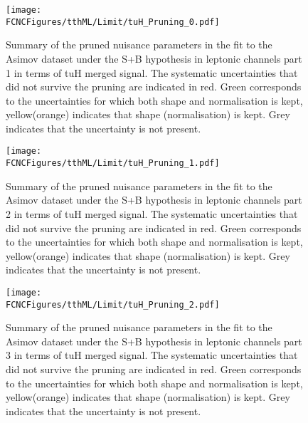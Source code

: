 \begin{figure}[htb]
\centering
\texttt{[image: \\FCNCFigures/tthML/Limit/tuH\_Pruning\_0.pdf]}
\caption{ Summary of the pruned nuisance parameters in the fit to the  Asimov dataset under the S+B hypothesis in leptonic channels part 1 in terms of tuH merged signal. The systematic uncertainties that did not survive the pruning are indicated in red. Green corresponds to the uncertainties for which both shape and normalisation is kept, yellow(orange) indicates that shape (normalisation) is kept. Grey indicates that the uncertainty is not present.}
\label{fig:tthML_pruning_0}
\end{figure}

\begin{figure}[htb]
\centering
\texttt{[image: \\FCNCFigures/tthML/Limit/tuH\_Pruning\_1.pdf]}
\caption{ Summary of the pruned nuisance parameters in the fit to the  Asimov dataset under the S+B hypothesis in leptonic channels part 2 in terms of tuH merged signal. The systematic uncertainties that did not survive the pruning are indicated in red. Green corresponds to the uncertainties for which both shape and normalisation is kept, yellow(orange) indicates that shape (normalisation) is kept. Grey indicates that the uncertainty is not present. }
\label{fig:tthML_pruning_1}
\end{figure}

\begin{figure}[htb]
\centering
\texttt{[image: \\FCNCFigures/tthML/Limit/tuH\_Pruning\_2.pdf]}
\caption{ Summary of the pruned nuisance parameters in the fit to the  Asimov dataset under the S+B hypothesis in leptonic channels part 3 in terms of tuH merged signal. The systematic uncertainties that did not survive the pruning are indicated in red. Green corresponds to the uncertainties for which both shape and normalisation is kept, yellow(orange) indicates that shape (normalisation) is kept. Grey indicates that the uncertainty is not present.}
\label{fig:tthML_pruning_2}
\end{figure}


